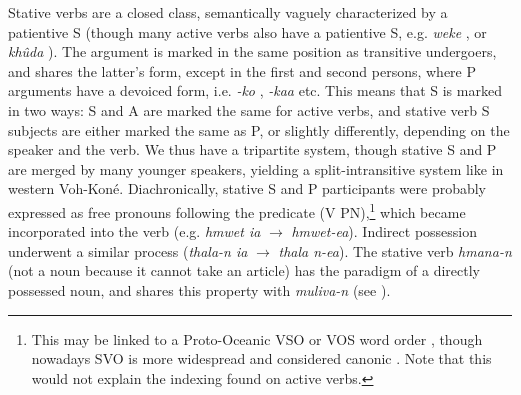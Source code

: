 Stative verbs are a closed class, semantically vaguely characterized by a patientive S (though many active verbs also have a patientive S, e.g. \textit{weke} , or \textit{khûda} ). The argument is marked in the same position as transitive undergoers, and shares the latter's form, except in the first and second persons, where P arguments have a devoiced form, i.e. \textit{-ko} , \textit{-kaa}  etc. This means that S is marked in two ways: S and A are marked the same for active verbs, and stative verb S subjects are either marked the same as P, or slightly differently, depending on the speaker and the verb. We thus have a tripartite system, though stative S and P are merged by many younger speakers, yielding a split-intransitive system like in western Voh-Koné. Diachronically, stative S and P participants were probably expressed as free pronouns following the predicate (V PN),\footnote{This may be linked to a Proto-Oceanic VSO or VOS word order \parencite[86, 87]{lynch_oceanic_2002}, though nowadays SVO is more widespread and considered canonic \parencite[49]{lynch_oceanic_2002}. Note that this would not explain the indexing found on active verbs.} which became incorporated into the verb (e.g. \textit{hmwet ia}  $\rightarrow$ \textit{hmwet-ea}). Indirect possession underwent a similar process (\textit{thala-n ia}  $\rightarrow$ \textit{thala n-ea}). 
The stative verb \textit{hmana-n}  (not a noun because it cannot take an article) has the paradigm of a directly possessed noun, and shares this property with \textit{muliva-n}  (see ).



